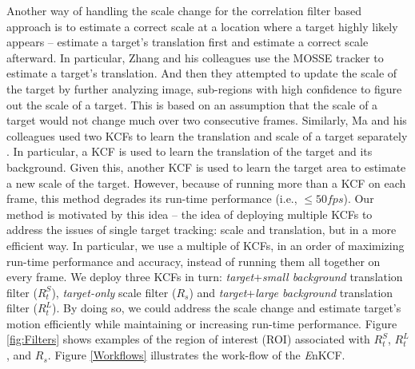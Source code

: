\documentclass{bmvc2k}
\begin{document}
Another way of handling the scale change for the correlation filter
based approach is to estimate a correct scale at a location where a
target highly likely appears \cite{zhang2014fast} -- estimate a
target's translation first and estimate a correct scale afterward. In
particular, Zhang and his colleagues use the MOSSE tracker to estimate
a target's translation. And then they attempted to update the scale of
the target by further analyzing image, sub-regions with high
confidence to figure out the scale of a target. This is based on an
assumption that the scale of a target would not change much over two
consecutive frames. Similarly, Ma and his colleagues used two KCFs to
learn the translation and scale of a target separately
\cite{ma2015long}. In particular, a KCF is used to learn the
translation of the target and its background. Given this, another KCF
is used to learn the target area to estimate a new scale of the
target. However, because of running more than a KCF on each frame,
this method degrades its run-time performance (i.e., $\leq 50
fps$). Our method is motivated by this idea -- the idea of deploying
multiple KCFs to address the issues of single target tracking: scale
and translation, but in a more efficient way. In particular, we use a
multiple of KCFs, in an order of maximizing run-time performance and
accuracy, instead of running them all together on every frame. We
deploy three KCFs in turn: \textit{target}+\textit{small background}
translation filter ($R_{t}^{S}$), \textit{target-only} scale filter
($R_{s}$) and \textit{target}+\textit{large background} translation
filter ($R_{t}^{L}$). By doing so, we could address the scale change
and estimate target's motion efficiently while maintaining or
increasing run-time performance. Figure \ref{fig:Filters} shows
examples of the region of interest (ROI) associated with $R_{t}^{S}$,
$R_{t}^{L}$, and $R_{s}$. Figure \ref{Workflows} illustrates the
work-flow of the {\it E}nKCF.
\end{document}
